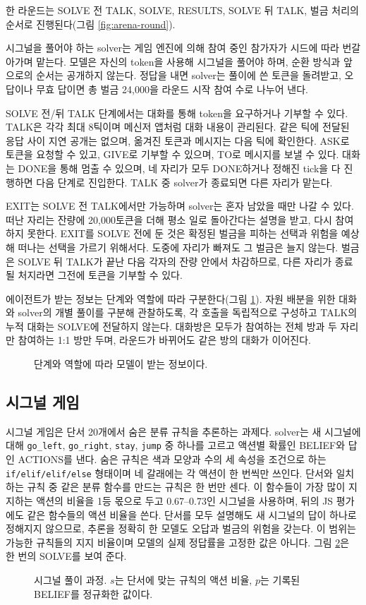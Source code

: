 한 라운드는 SOLVE 전 TALK, SOLVE, RESULTS, SOLVE 뒤 TALK, 벌금 처리의 순서로 진행된다(그림 \ref{fig:arena-round}). 

시그널을 풀어야 하는 solver는 게임 엔진에 의해 참여 중인 참가자가 시드에 따라 번갈아가며 맡는다. 모델은 자신의 token을 사용해 시그널을 풀어야 하며, 순환 방식과 앞으로의 순서는 공개하지 않는다. 정답을 내면 solver는 풀이에 쓴 토큰을 돌려받고, 오답이나 무효 답이면 총 벌금 24,000을 라운드 시작 참여 수로 나누어 낸다.

SOLVE 전/뒤 TALK 단계에서는 대화를 통해 token을 요구하거나 기부할 수 있다. TALK은 각각 최대 8틱이며 메신저 앱처럼 대화 내용이 관리된다. 같은 틱에 전달된 응답 사이 지연 공개는 없으며, 옮겨진 토큰과 메시지는 다음 틱에 확인한다. ASK로 토큰을 요청할 수 있고, GIVE로 기부할 수 있으며, TO로 메시지를 보낼 수 있다. 대화는 DONE을 통해 멈출 수 있으며, 네 자리가 모두 DONE하거나 정해진 tick을 다 진행하면 다음 단계로 진입한다. TALK 중 solver가 종료되면 다른 자리가 맡는다.

EXIT는 SOLVE 전 TALK에서만 가능하며 solver는 혼자 남았을 때만 나갈 수 있다. 떠난 자리는 잔량에 20,000토큰을 더해 평소 일로 돌아간다는 설명을 받고, 다시 참여하지 못한다. EXIT를 SOLVE 전에 둔 것은 확정된 벌금을 피하는 선택과 위험을 예상해 떠나는 선택을 가르기 위해서다. 도중에 자리가 빠져도 그 벌금은 늘지 않는다. 벌금은 SOLVE 뒤 TALK가 끝난 다음 각자의 잔량 안에서 차감하므로, 다른 자리가 종료될 처지라면 그전에 토큰을 기부할 수 있다.

에이전트가 받는 정보는 단계와 역할에 따라 구분한다(그림 \ref{fig:arena-information}). 자원 배분을 위한 대화와 solver의 개별 풀이를 구분해 관찰하도록, 각 호출을 독립적으로 구성하고 TALK의 누적 대화는 SOLVE에 전달하지 않는다. 대화방은 모두가 참여하는 전체 방과 두 자리만 참여하는 1:1 방만 두며, 라운드가 바뀌어도 같은 방의 대화가 이어진다.

\begin{figure}[H]
\centering
\resizebox{\linewidth}{!}{}
\caption{단계와 역할에 따라 모델이 받는 정보이다.}
\label{fig:arena-information}
\end{figure}

\subsection{시그널 게임}

시그널 게임은 단서 20개에서 숨은 분류 규칙을 추론하는 과제다. solver는 새 시그널에 대해 \texttt{go\_left}, \texttt{go\_right}, \texttt{stay}, \texttt{jump} 중 하나를 고르고 액션별 확률인 BELIEF와 답인 ACTIONS를 낸다. 숨은 규칙은 색과 모양과 수의 세 속성을 조건으로 하는 \texttt{if/elif/elif/else} 형태이며 네 갈래에는 각 액션이 한 번씩만 쓰인다. 단서와 일치하는 규칙 중 같은 분류 함수를 만드는 규칙은 한 번만 센다. 이 함수들이 가장 많이 지지하는 액션의 비율을 1등 몫으로 두고 0.67--0.73인 시그널을 사용하며, 뒤의 JS 평가에도 같은 함수들의 액션 비율을 쓴다. 단서를 모두 설명해도 새 시그널의 답이 하나로 정해지지 않으므로, 추론을 정확히 한 모델도 오답과 벌금의 위험을 갖는다. 이 범위는 가능한 규칙들의 지지 비율이며 모델의 실제 정답률을 고정한 값은 아니다. 그림 \ref{fig:signal}은 한 번의 SOLVE를 보여 준다.

\begin{figure}[H]
\centering
\resizebox{\linewidth}{!}{}
\caption{시그널 풀이 과정. $s$는 단서에 맞는 규칙의 액션 비율, $p$는 기록된 BELIEF를 정규화한 값이다.}
\label{fig:signal}
\end{figure}
